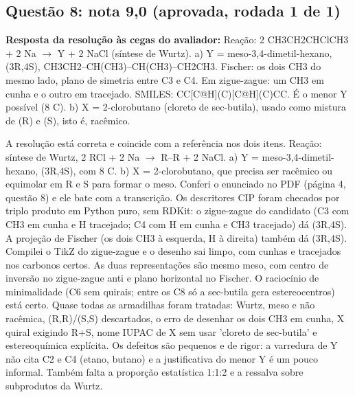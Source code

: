 \documentclass{article}%
\begin{document}
\subsection*{Questão 8: nota 9,0 (aprovada, rodada 1 de 1)}%
\textbf{Resposta da resolução às cegas do avaliador:} Reação: 2 CH3CH2CHClCH3 + 2 Na $\to$ Y + 2 NaCl (síntese de Wurtz).\newline%
a) Y = meso{-}3,4{-}dimetil{-}hexano, (3R,4S), CH3CH2--CH(CH3)--CH(CH3)--CH2CH3. Fischer: os dois CH3 do mesmo lado, plano de simetria entre C3 e C4. Em zigue{-}zague: um CH3 em cunha e o outro em tracejado. SMILES: CC{[}C@H{]}(C){[}C@H{]}(C)CC. É o menor Y possível (8 C).\newline%
b) X = 2{-}clorobutano (cloreto de sec{-}butila), usado como mistura de (R) e (S), isto é, racêmico.\par %
A resolução está correta e coincide com a referência nos dois itens. Reação: síntese de Wurtz, 2 RCl + 2 Na $\to$ R--R + 2 NaCl. a) Y = meso{-}3,4{-}dimetil{-}hexano, (3R,4S), com 8 C. b) X = 2{-}clorobutano, que precisa ser racêmico ou equimolar em R e S para formar o meso. Conferi o enunciado no PDF (página 4, questão 8) e ele bate com a transcrição. Os descritores CIP foram checados por triplo produto em Python puro, sem RDKit: o zigue{-}zague do candidato (C3 com CH3 em cunha e H tracejado; C4 com H em cunha e CH3 tracejado) dá (3R,4S). A projeção de Fischer (os dois CH3 à esquerda, H à direita) também dá (3R,4S). Compilei o TikZ do zigue{-}zague e o desenho sai limpo, com cunhas e tracejados nos carbonos certos. As duas representações são mesmo meso, com centro de inversão no zigue{-}zague anti e plano horizontal no Fischer. O raciocínio de minimalidade (C6 sem quirais; entre os C8 só a sec{-}butila gera estereocentros) está certo. Quase todas as armadilhas foram tratadas: Wurtz, meso e não racêmica, (R,R)/(S,S) descartados, o erro de desenhar os dois CH3 em cunha, X quiral exigindo R+S, nome IUPAC de X sem usar 'cloreto de sec{-}butila' e estereoquímica explícita. Os defeitos são pequenos e de rigor: a varredura de Y não cita C2 e C4 (etano, butano) e a justificativa do menor Y é um pouco informal. Também falta a proporção estatística 1:1:2 e a ressalva sobre subprodutos da Wurtz.%
\end{document}
